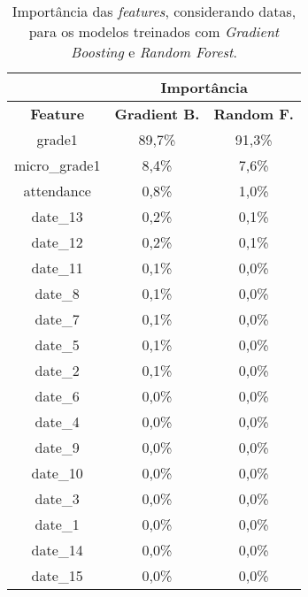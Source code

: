 \begin{table}[!htb]
    \centering
    \caption{Importância das \textit{features}, considerando datas, para os modelos treinados com \textit{Gradient Boosting} e \textit{Random Forest}.}
    \begin{tabular}{@{}ccc@{}}
    \textbf{} & \multicolumn{2}{c}{\textbf{Importância}} \\ \midrule
    \textbf{Feature} & \textbf{Gradient B.} & \textbf{Random F.} \\ \midrule
        grade1 & 89,7\%  &  91,3\% \\
        micro\_grade1  & 8,4\%  &  7,6\% \\
        attendance  & 0,8\%  &  1,0\% \\
        date\_13  & 0,2\%  &  0,1\% \\
        date\_12  & 0,2\%  &  0,1\% \\ 
        date\_11  & 0,1\%  &  0,0\% \\
        date\_8  & 0,1\%  &  0,0\% \\
        date\_7  & 0,1\%  &  0,0\% \\
        date\_5  & 0,1\%  &  0,0\% \\
        date\_2  & 0,1\%  &  0,0\% \\
        date\_6  & 0,0\%  &  0,0\% \\
        date\_4  & 0,0\%  &  0,0\% \\
        date\_9  & 0,0\%  &  0,0\% \\
        date\_10  & 0,0\%  &  0,0\% \\
        date\_3  & 0,0\%  &  0,0\% \\
        date\_1  & 0,0\%  &  0,0\% \\
        date\_14  & 0,0\%  &  0,0\% \\
        date\_15  & 0,0\%  &  0,0\% \\
        \bottomrule
    \end{tabular}
    \label{tab:importanciaComDatas}
\end{table}